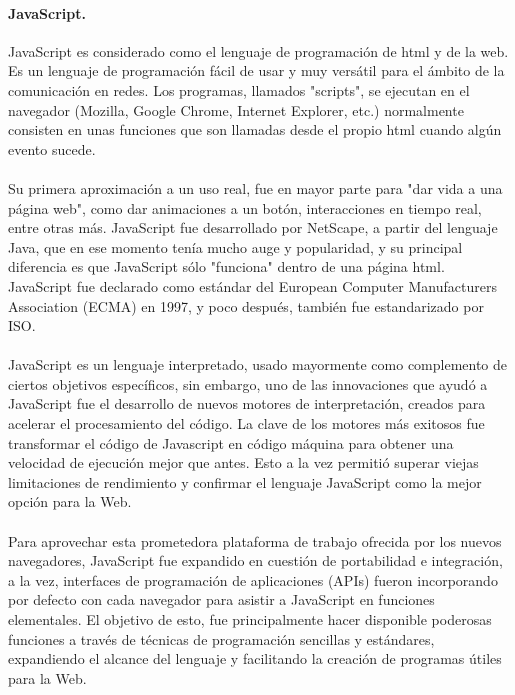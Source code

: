\documentclass[12pt, a4paper, titlepage]{report}
\begin{document}
				\paragraph {JavaScript. \\}
				JavaScript es considerado como el lenguaje de programación de \acrshort{html} y de la web. Es un lenguaje de programación fácil de usar y muy versátil para el ámbito de la comunicación en redes. Los programas, llamados "scripts", se ejecutan en el navegador (Mozilla, Google Chrome, Internet Explorer, etc.) normalmente consisten en unas funciones que son llamadas desde el propio \acrshort{html} cuando algún evento sucede.\\\\
				Su primera aproximación a un uso real, fue en mayor parte para "dar vida a una página web", como dar animaciones a un botón, interacciones en tiempo real, entre otras más. 
				JavaScript fue desarrollado por \Gls{NetScape}, a partir del lenguaje Java, que en ese momento tenía mucho auge y popularidad, y su principal diferencia es que JavaScript sólo "funciona" dentro de una página \acrshort{html}.\\
				JavaScript fue declarado como estándar del European Computer Manufacturers Association (ECMA) en 1997, y poco después, también fue estandarizado por ISO.\cite{refJavaScript} \\\\ 
				JavaScript es un lenguaje interpretado, usado mayormente como complemento de ciertos objetivos específicos, sin embargo, uno de las innovaciones que ayudó a JavaScript fue el desarrollo de nuevos motores de interpretación, creados para acelerar el procesamiento del código. La clave de los motores más exitosos fue transformar el código de Javascript en código máquina para obtener una velocidad de ejecución mejor que antes. Esto a la vez permitió superar viejas limitaciones de rendimiento y confirmar el lenguaje JavaScript como la mejor opción para la Web.\\\\
				
				Para aprovechar esta prometedora plataforma de trabajo ofrecida por los nuevos navegadores, JavaScript fue expandido en cuestión de portabilidad e integración, a la vez, interfaces de programación de aplicaciones (APIs) fueron incorporando por defecto con cada navegador para asistir a JavaScript en funciones elementales. El objetivo de esto, fue principalmente hacer disponible poderosas funciones a través de técnicas de programación sencillas y estándares, expandiendo el alcance del lenguaje y facilitando la creación de programas útiles para la Web.\cite{refElGranLibro}
				
\end{document}
